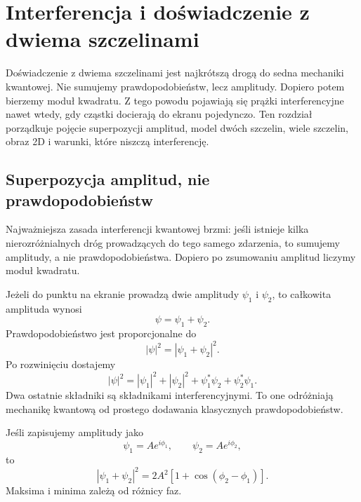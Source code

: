 \chapter{Interferencja i doświadczenie z dwiema szczelinami}

\begin{summarybox}
Doświadczenie z dwiema szczelinami jest najkrótszą drogą do sedna mechaniki
kwantowej. Nie sumujemy prawdopodobieństw, lecz amplitudy. Dopiero potem bierzemy
moduł kwadratu. Z tego powodu pojawiają się prążki interferencyjne nawet wtedy,
gdy cząstki docierają do ekranu pojedynczo. Ten rozdział porządkuje pojęcie
superpozycji amplitud, model dwóch szczelin, wiele szczelin, obraz 2D i warunki,
które niszczą interferencję.
\end{summarybox}

\section{Superpozycja amplitud, nie prawdopodobieństw}

Najważniejsza zasada interferencji kwantowej brzmi: jeśli istnieje kilka nierozróżnialnych dróg prowadzących do tego samego zdarzenia, to sumujemy amplitudy, a nie prawdopodobieństwa. Dopiero po zsumowaniu amplitud liczymy moduł kwadratu.

Jeżeli do punktu na ekranie prowadzą dwie amplitudy \(\psi_1\) i \(\psi_2\), to całkowita amplituda wynosi
\begin{equation}
    \psi=\psi_1+\psi_2.
\end{equation}
Prawdopodobieństwo jest proporcjonalne do
\begin{equation}
    |\psi|^2=|\psi_1+\psi_2|^2.
\end{equation}
Po rozwinięciu dostajemy
\begin{equation}
    |\psi|^2=|\psi_1|^2+|\psi_2|^2+\psi_1^*\psi_2+\psi_2^*\psi_1.
\end{equation}
Dwa ostatnie składniki są składnikami interferencyjnymi. To one odróżniają mechanikę kwantową od prostego dodawania klasycznych prawdopodobieństw.

Jeśli zapisujemy amplitudy jako
\begin{equation}
    \psi_1=Ae^{i\phi_1},
    \qquad
    \psi_2=Ae^{i\phi_2},
\end{equation}
to
\begin{equation}
    |\psi_1+\psi_2|^2=2A^2\left[1+\cos(\phi_2-\phi_1)\right].
\end{equation}
Maksima i minima zależą od różnicy faz.

